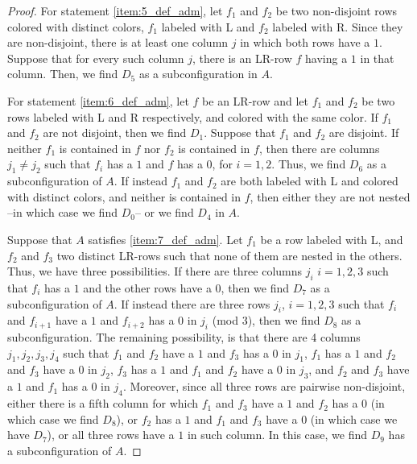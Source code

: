 \documentclass[12pt]{book}
\theoremstyle{plain}
\theoremstyle{remark}
\begin{document}
\begin{proof}
For statement \ref{item:5_def_adm}, let $f_1$ and $f_2$ be two non-disjoint rows colored with distinct colors, $f_1$ labeled with L and $f_2$ labeled with R. Since they are non-disjoint, there is at least one column $j$ in which both rows have a $1$. Suppose that for every such column $j$, there is an LR-row $f$ having a $1$ in that column. Then, we find $D_5$ as a subconfiguration in $A$.

For statement \ref{item:6_def_adm}, let $f$ be an LR-row and let $f_1$ and $f_2$ be two rows labeled with L and R respectively, and colored with the same color. If $f_1$ and $f_2$ are not disjoint, then we find $D_1$. Suppose that $f_1$ and $f_2$ are disjoint.
If neither $f_1$ is contained in $f$ nor $f_2$ is contained in $f$, then there are columns $j_1 \neq j_2$ such that $f_i$ has a $1$ and $f$ has a $0$, for $i=1, 2$. Thus, we find $D_6$ as a subconfiguration of $A$. If instead $f_1$ and $f_2$ are both labeled with L and colored with distinct colors, and neither is contained in $f$, then either they are not nested --in which case we find $D_0$-- or we find $D_4$ in $A$.

Suppose that $A$ satisfies \ref{item:7_def_adm}. Let $f_1$ be a row labeled with L, and $f_2$ and $f_3$ two distinct LR-rows such that none of them are nested in the others. Thus, we have three possibilities. If there are three columns $j_i$ $i=1,2,3$ such that $f_i$ has a $1$ and the other rows have a $0$, then we find $D_7$ as a subconfiguration of $A$.
If instead there are three rows $j_i$, $i=1,2,3$ such that $f_i$ and $f_{i+1}$ have a $1$ and $f_{i+2}$ has a $0$ in $j_i$ (mod 3), then we find $D_8$ as a subconfiguration.
The remaining possibility, is that there are 4 columns $j_1, j_2, j_3, j_4$ such that $f_1$ and $f_2$ have a $1$ and $f_3$ has a $0$ in $j_1$, $f_1$ has a $1$ and $f_2$ and $f_3$ have a $0$ in $j_2$, $f_3$ has a $1$ and $f_1$ and $f_2$ have a $0$ in $j_3$, and $f_2$ and $f_3$ have a $1$ and $f_1$ has a $0$ in $j_4$. Moreover, since all three rows are pairwise non-disjoint, either there is a fifth column for which $f_1$ and $f_3$ have a $1$ and $f_2$ has a $0$ (in which case we find $D_8$), or $f_2$ has a $1$ and $f_1$ and $f_3$ have a $0$ (in which case we have $D_7$), or all three rows have a $1$ in such column. In this case, we find $D_9$ has a subconfiguration of $A$.


\end{proof}
\end{document}
